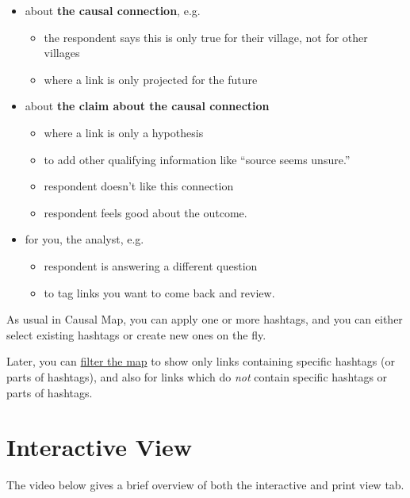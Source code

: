 \documentclass[
]{book}
\providecommand{\tightlist}{%
  \setlength{\itemsep}{0pt}\setlength{\parskip}{0pt}}
\begin{document}
\begin{itemize}
\tightlist
\item
  about \textbf{the causal connection}, e.g.

  \begin{itemize}
  \tightlist
  \item
    the respondent says this is only true for their village, not for other villages
  \item
    where a link is only projected for the future
  \end{itemize}
\item
  about \textbf{the claim about the causal connection}

  \begin{itemize}
  \tightlist
  \item
    where a link is only a hypothesis
  \item
    to add other qualifying information like ``source seems unsure.''
  \item
    respondent doesn't like this connection
  \item
    respondent feels good about the outcome.
  \end{itemize}
\item
  for you, the analyst, e.g.

  \begin{itemize}
  \tightlist
  \item
    respondent is answering a different question
  \item
    to tag links you want to come back and review.
  \end{itemize}
\end{itemize}

As usual in Causal Map, you can apply one or more hashtags, and you can either select existing hashtags or create new ones on the fly.

Later, you can \href{https://guide.causalmap.app/analysis.html\#filtering-the-map-by-link-hashtag-memo}{filter the map} to show only links containing specific hashtags (or parts of hashtags), and also for links which do \emph{not} contain specific hashtags or parts of hashtags.

\hypertarget{xinteractive-view}{%
\chapter{Interactive View}\label{xinteractive-view}}

The video below gives a brief overview of both the interactive and print view tab.
\end{document}
